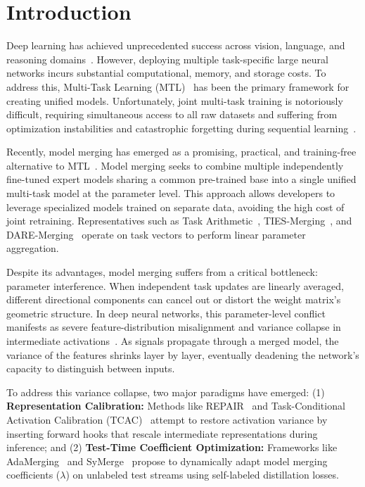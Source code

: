 \documentclass{article}
\theoremstyle{plain}
\theoremstyle{definition}
\theoremstyle{remark}
\begin{document}
\section{Introduction}
\label{sec:intro}

Deep learning has achieved unprecedented success across vision, language, and reasoning domains~\cite{vaswani2017attention, devlin2018bert, brown2020language, touvron2023llama, dosovitskiy2020image}. However, deploying multiple task-specific large neural networks incurs substantial computational, memory, and storage costs. To address this, Multi-Task Learning (MTL)~\cite{caruana1997multitask} has been the primary framework for creating unified models. Unfortunately, joint multi-task training is notoriously difficult, requiring simultaneous access to all raw datasets and suffering from optimization instabilities and catastrophic forgetting during sequential learning~\cite{kirkpatrick2017overcoming, buzzega2020dark}.

Recently, model merging has emerged as a promising, practical, and training-free alternative to MTL~\cite{wortsman2022robust, ilharco2022editing}. Model merging seeks to combine multiple independently fine-tuned expert models sharing a common pre-trained base into a single unified multi-task model at the parameter level. This approach allows developers to leverage specialized models trained on separate data, avoiding the high cost of joint retraining. Representatives such as Task Arithmetic~\cite{ilharco2022editing}, TIES-Merging~\cite{yadav2023ties}, and DARE-Merging~\cite{yu2024language} operate on task vectors to perform linear parameter aggregation.

Despite its advantages, model merging suffers from a critical bottleneck: parameter interference. When independent task updates are linearly averaged, different directional components can cancel out or distort the weight matrix's geometric structure. In deep neural networks, this parameter-level conflict manifests as severe feature-distribution misalignment and variance collapse in intermediate activations~\cite{jordan2022repair}. As signals propagate through a merged model, the variance of the features shrinks layer by layer, eventually deadening the network's capacity to distinguish between inputs.

To address this variance collapse, two major paradigms have emerged: (1) \textbf{Representation Calibration:} Methods like REPAIR~\cite{jordan2022repair} and Task-Conditional Activation Calibration (TCAC)~\cite{tcac2026} attempt to restore activation variance by inserting forward hooks that rescale intermediate representations during inference; and (2) \textbf{Test-Time Coefficient Optimization:} Frameworks like AdaMerging~\cite{yang2024adamerging} and SyMerge~\cite{symerge2026} propose to dynamically adapt model merging coefficients ($\lambda$) on unlabeled test streams using self-labeled distillation losses.
\end{document}

